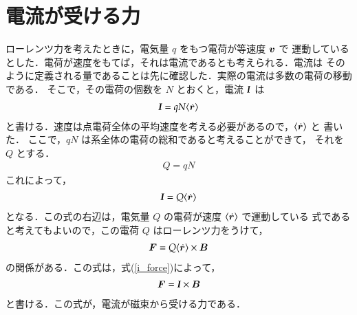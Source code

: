 \section{電流が受ける力}\label{dennryuunoukerutikara}
    ローレンツ力を考えたときに，電気量 $q$ をもつ電荷が等速度 $\boldsymbol{v}$ で
    運動しているとした．電荷が速度をもてば，それは電流であるとも考えられる．電流は
    そのように定義される量であることは先に確認した．実際の電流は多数の電荷の移動である．
    そこで，その電荷の個数を $N$ とおくと，電流 $\textit{\textbf{I}}$ は
        \begin{align}
            \textit{\textbf{I}}=qN\langle\dot{\boldsymbol{r}}\rangle
        \end{align}
    と書ける．速度は点電荷全体の平均速度を考える必要があるので，$\langle\dot{\boldsymbol{r}}\rangle$ と
    書いた．
    ここで，$qN$ は系全体の電荷の総和であると考えることができて，
    それを $Q$ とする．
        \begin{align*}
            Q=qN
        \end{align*}
    これによって，
        \begin{align}\label{i_force}
            \textit{\textbf{I}}=Q\langle\dot{\br}\rangle
        \end{align}
    となる．この式の右辺は，電気量 $Q$ の電荷が速度 $\langle\dot{\boldsymbol{r}}\rangle$ で運動している
    式であると考えてもよいので，この電荷 $Q$ はローレンツ力をうけて，
        \begin{align}
            \boldsymbol{F}=Q\langle\dot{\boldsymbol{r}}\rangle\times \boldsymbol{B}
        \end{align}
    の関係がある．この式は，式(\ref{i_force})によって，
        \begin{align}\label{denruu_F}
            \bF=\textit{\textbf{I}}\times \bB
        \end{align}
    と書ける．この式が，電流が磁束から受ける力である．

